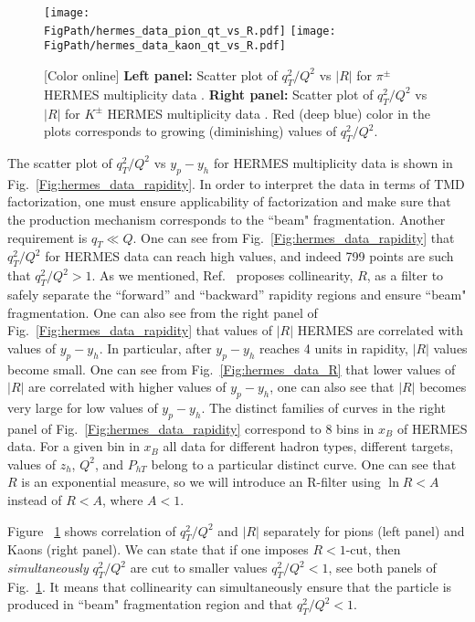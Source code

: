 \documentclass[final,3p,times,onecolumn,sort&compress,hidelinks]{elsarticle}
\newcommand\3[1]{\boldsymbol{#1}}
\newcommand*{\FigPath}{../Figs/}%
\begin{document}
\begin{figure}[htb!]
\centering
\texttt{[image: \\FigPath/hermes\_data\_pion\_qt\_vs\_R.pdf]}
\texttt{[image: \\FigPath/hermes\_data\_kaon\_qt\_vs\_R.pdf]}
\caption{\label{Fig:hermes_data_qt_vs_R}
[Color online] {\bf Left panel:} Scatter plot of $q_T^2/Q^2$ vs $|R|$ for $\pi^\pm$ HERMES multiplicity data . {\bf Right panel:} 
Scatter plot of $q_T^2/Q^2$ vs $|R|$ for $K^\pm$ HERMES multiplicity data . Red (deep blue) color in the plots corresponds to growing (diminishing) values of $q_T^2/Q^2$.
}
\end{figure}
The scatter plot of  $q_T^2/Q^2$ vs $y_p-y_h$ for HERMES multiplicity data is shown in Fig.~\ref{Fig:hermes_data_rapidity}. In order to interpret the data in terms of TMD factorization, one must ensure applicability of factorization and make sure that the production mechanism corresponds to the ``beam" fragmentation. Another requirement is $q_T \ll Q$. One can see from Fig.~\ref{Fig:hermes_data_rapidity} that  $q_T^2/Q^2$ for HERMES data can reach high values, and indeed 799 points are such that $q_T^2/Q^2>1$. As we mentioned, Ref.~\cite{Boglione:2016bph} proposes collinearity, $R$, as a filter to  safely separate the ``forward'' and ``backward'' rapidity regions and ensure ``beam" fragmentation. One can also see from the right panel of Fig.~\ref{Fig:hermes_data_rapidity}  that values of $|R|$ HERMES are correlated with values of $y_p-y_h$. In particular, after $y_p-y_h$ reaches 4 units in rapidity, $|R|$ values become small. One can see from Fig.~\ref{Fig:hermes_data_R} that lower values of $|R|$ are correlated with higher values of $y_p-y_h$, one can also see that $|R|$ becomes very large for low values of $y_p-y_h$. The distinct families of curves in the right panel of Fig.~\ref{Fig:hermes_data_rapidity} correspond to 8 bins in $x_B$ of HERMES data. For a given bin in $x_B$ all data for different hadron types, different targets, values of $z_h$, $Q^2$, and $P_{hT}$ belong to a particular distinct curve. One can see that $R$ is an exponential measure, so we will introduce an R-filter using $\ln R < A$ instead of $R < A$, where $A < 1$. 


Figure ~\ref{Fig:hermes_data_qt_vs_R} shows correlation of $q_T^2/Q^2$ and $|R|$ separately for pions (left panel) and Kaons (right panel).
We can state that if one imposes $R<1$-cut, then {\em simultaneously}  $q_T^2/Q^2$ are cut to smaller values $q_T^2/Q^2<1$, see both panels of Fig.~\ref{Fig:hermes_data_qt_vs_R}. It means that collinearity can simultaneously ensure that the particle is produced in ``beam" fragmentation region and that $q_T^2/Q^2<1$.
\end{document}
